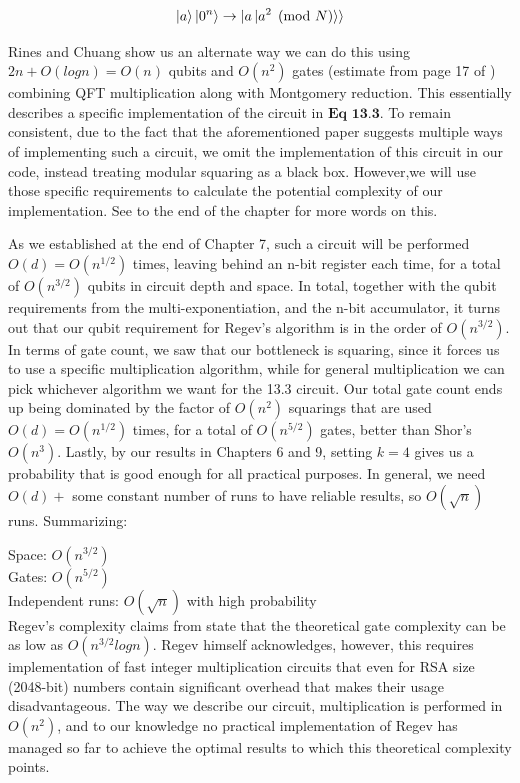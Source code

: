 \begin{equation}
    \ket{a} \ket{0^n} \to \ket{a \ket{a^2 \pmod N}}
\end{equation}

Rines and Chuang \cite{RinesChuang2018} show us an alternate way we can do this using $2n + O(logn) = O(n)$ qubits and $O(n^2)$ gates (estimate from page 17 of \cite{RagavanVaikuntanathan2023}) combining QFT multiplication along with Montgomery reduction. This essentially describes a specific implementation of the circuit in $\textbf{Eq 13.3}$. To remain consistent, due to the fact that the aforementioned paper suggests multiple ways of implementing such a circuit, we omit the implementation of this circuit in our code, instead treating modular squaring as a black box. However,we will use those specific requirements to calculate the potential complexity of our implementation. See to the end of the chapter for more words on this.

As we established at the end of Chapter 7, such a circuit will be performed $O(d) = O(n^{1/2})$ times, leaving behind an n-bit register each time, for a total of $O(n^{3/2})$ qubits in circuit depth and space. In total, together with the qubit requirements from the multi-exponentiation, and the n-bit accumulator, it turns out that our qubit requirement for Regev's algorithm is in the order of $O(n^{3/2})$. In terms of gate count, we saw that our bottleneck is squaring, since it forces us to use a specific multiplication algorithm, while for general multiplication we can pick whichever algorithm we want for the 13.3 circuit. Our total gate count ends up being dominated by the factor of $O(n^2)$ squarings that are used $O(d) = O(n^{1/2})$ times, for a total of $O(n^{5/2})$ gates, better than Shor's $O(n^3)$. Lastly, by our results in Chapters 6 and 9, setting $k = 4$ gives us a probability that is good enough for all practical purposes. In general, we need $O(d) + $ some constant number of runs to have reliable results, so $O(\sqrt{n})$ runs. Summarizing:

Space: $O(n^{3/2})$\\
Gates: $O(n^{5/2})$\\
Independent runs: $O(\sqrt{n})$ with high probability\\

Regev's complexity claims from \cite{Regev2025} state that the theoretical gate complexity can be as low as $O(n^{3/2} logn)$. Regev himself acknowledges, however, this requires implementation of fast integer multiplication circuits that even for RSA size (2048-bit) numbers contain significant overhead that makes their usage disadvantageous. The way we describe our circuit, multiplication is performed in $O(n^2)$, and to our knowledge no practical implementation of Regev has managed so far to achieve the optimal results to which this theoretical complexity points.







